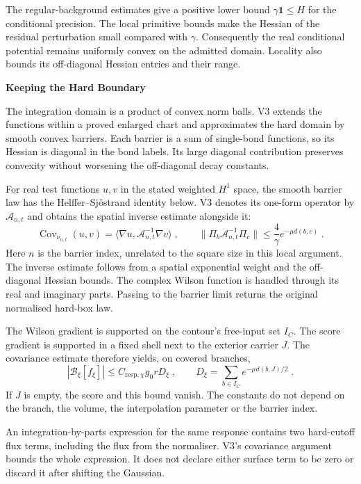 \documentclass[11pt,a4paper]{article}
\newcommand{\id}{\mathbf 1}
\newcommand{\subhead}[1]{\par\vspace{4pt}\textbf{\color{ink}#1}\par}
\begin{document}
The regular-background estimates give a positive lower bound $\gamma\id\leq H$ for the conditional precision. The local primitive bounds make the Hessian of the residual perturbation small compared with $\gamma$. Consequently the real conditional potential remains uniformly convex on the admitted domain. Locality also bounds its off-diagonal Hessian entries and their range.

\subhead{Keeping the Hard Boundary}
The integration domain is a product of convex norm balls. V3 extends the functions within a proved enlarged chart and approximates the hard domain by smooth convex barriers. Each barrier is a sum of single-bond functions, so its Hessian is diagonal in the bond labels. Its large diagonal contribution preserves convexity without worsening the off-diagonal decay constants.

For real test functions $u,v$ in the stated weighted $H^1$ space, the smooth barrier law has the Helffer--Sj\"ostrand identity below. V3 denotes its one-form operator by $\mathscr A_{n,t}$ and obtains the spatial inverse estimate alongside it:
\begin{equation*}
    \operatorname{Cov}_{\nu_{n,t}}(u,v)
        =\langle\nabla u,\mathscr A_{n,t}^{-1}\nabla v\rangle\;,
    \qquad
    \|\Pi_b\mathscr A_{n,t}^{-1}\Pi_c\|
        \leq \frac{4}{\gamma}e^{-\mu d(b,c)}\;.
\end{equation*}
Here $n$ is the barrier index, unrelated to the square size in this local argument. The inverse estimate follows from a spatial exponential weight and the off-diagonal Hessian bounds. The complex Wilson function is handled through its real and imaginary parts. Passing to the barrier limit returns the original normalised hard-box law.

The Wilson gradient is supported on the contour's free-input set $I_C$. The score gradient is supported in a fixed shell next to the exterior carrier $J$. The covariance estimate therefore yields, on covered branches,
\begin{equation*}
    |\mathcal B_\xi[f_\xi]|
        \leq C_{\mathrm{resp},\chi}g_0rD_\xi\;,
    \qquad D_\xi=\sum_{b\in I_C}e^{-\mu d(b,J)/2}\;.
\end{equation*}
If $J$ is empty, the score and this bound vanish. The constants do not depend on the branch, the volume, the interpolation parameter or the barrier index.

An integration-by-parts expression for the same response contains two hard-cutoff flux terms, including the flux from the normaliser. V3's covariance argument bounds the whole expression. It does not declare either surface term to be zero or discard it after shifting the Gaussian.
\end{document}
